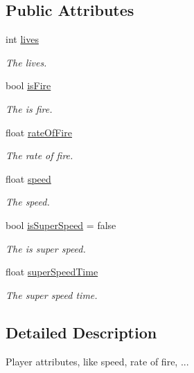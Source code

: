 \subsection*{Public Attributes}
\begin{DoxyCompactItemize}
\item 
int \mbox{\hyperlink{class_player_attributes_aa666ed9677fdae99cca2a98ab6796ea7}{lives}}
\begin{DoxyCompactList}\small\item\em The lives. \end{DoxyCompactList}\item 
bool \mbox{\hyperlink{class_player_attributes_a4bb2a3a44344d0e8e05ffd3c02b5e66c}{is\+Fire}}
\begin{DoxyCompactList}\small\item\em The is fire. \end{DoxyCompactList}\item 
float \mbox{\hyperlink{class_player_attributes_a8635c9f8b5b38f06899752f7df80a65b}{rate\+Of\+Fire}}
\begin{DoxyCompactList}\small\item\em The rate of fire. \end{DoxyCompactList}\item 
float \mbox{\hyperlink{class_player_attributes_a3c05ed20ca014ddef39d9e361bf9afe9}{speed}}
\begin{DoxyCompactList}\small\item\em The speed. \end{DoxyCompactList}\item 
bool \mbox{\hyperlink{class_player_attributes_a0b731fb2d368a90acfeaf37692bd1e33}{is\+Super\+Speed}} = false
\begin{DoxyCompactList}\small\item\em The is super speed. \end{DoxyCompactList}\item 
float \mbox{\hyperlink{class_player_attributes_a8d65a1b221e07cde721025345011066f}{super\+Speed\+Time}}
\begin{DoxyCompactList}\small\item\em The super speed time. \end{DoxyCompactList}\end{DoxyCompactItemize}


\subsection{Detailed Description}
Player attributes, like speed, rate of fire, ... 




